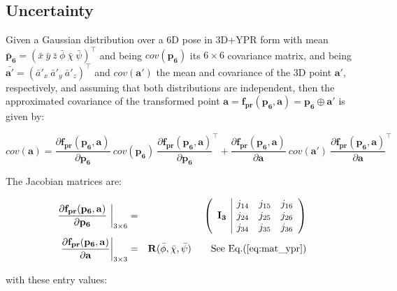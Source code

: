 \documentclass[a4paper,11pt]{report}
\begin{document}
\subsection{Uncertainty}

Given a Gaussian distribution over a 6D pose in 3D+YPR form with 
mean ${\mathbf{\bar{p}_6}= (\bar x ~\bar y ~\bar z ~ \bar\phi ~ \bar\chi ~ \bar\psi)^\top}$ and being $cov(\mathbf{p_6})$ its $6 \times 6$ covariance matrix, 
and being ${\mathbf{\bar{a'}} = (\bar a'_x ~\bar a'_y ~\bar a'_z )^\top }$ and $cov(\mathbf{a'})$ the mean and covariance of the 3D point 
$\mathbf{a'}$, respectively, and assuming that both distributions are independent, 
then the approximated covariance of the transformed point 
$\mathbf{a} = \mathbf{f_{pr}} (\mathbf{p_6},\mathbf{a}) = \mathbf{p_6} \oplus \mathbf{a'}$ is given by:

\begin{equation}
cov(\mathbf{a}) =
\frac{\partial \mathbf{f_{pr}} (\mathbf{p_6},\mathbf{a})}{\partial \mathbf{p_6}} ~
cov(\mathbf{p_6})  ~
\frac{\partial \mathbf{f_{pr}} (\mathbf{p_6},\mathbf{a})}{\partial \mathbf{p_6}}^\top 
+
\frac{\partial \mathbf{f_{pr}} (\mathbf{p_6},\mathbf{a})}{\partial \mathbf{a}} ~ 
cov(\mathbf{a'})  ~
\frac{\partial \mathbf{f_{pr}} (\mathbf{p_6},\mathbf{a})}{\partial \mathbf{a}}^\top
\end{equation}


The Jacobian matrices are:


\begin{eqnarray}
\left. \frac{\partial \mathbf{f_{pr}} (\mathbf{p_6},\mathbf{a})}{\partial \mathbf{p_6}} ~
\right|_{3 \times 6}
&=& 
\left(
\begin{array}{c|ccc}
~            & j_{14} & j_{15} & j_{16} \\
\mathbf{I_3} & j_{24} & j_{25} & j_{26} \\
~            & j_{34} & j_{35} & j_{36}
\end{array}
\right)
\\
\left.\frac{\partial \mathbf{f_{pr}} (\mathbf{p_6},\mathbf{a})}{\partial \mathbf{a}} 
\right|_{3 \times 3}
&=& 
\mathbf{R}(\bar\phi,\bar\chi,\bar\psi) \quad\quad \text{See Eq.(\ref{eq:mat_ypr})}
\end{eqnarray}

\noindent with these entry values:
\end{document}
